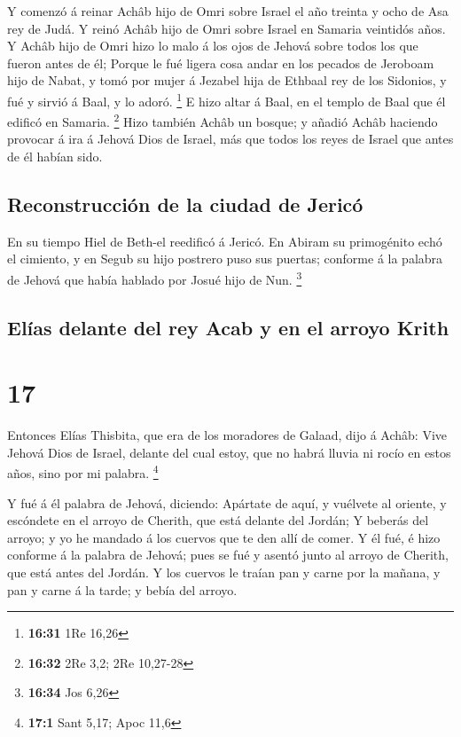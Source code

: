  Y comenzó á reinar Achâb hijo de Omri sobre Israel el
año treinta y ocho de Asa rey de Judá.  Y reinó Achâb
hijo de Omri sobre Israel en Samaria veintidós años. Y Achâb hijo de
Omri hizo lo malo á los ojos de Jehová sobre todos los que fueron antes
de él;  Porque le fué ligera cosa andar en los pecados de
Jeroboam hijo de Nabat, y tomó por mujer á Jezabel hija de Ethbaal rey
de los Sidonios, y fué y sirvió á Baal, y lo adoró. \footnote{\textbf{16:31}
  1Re 16,26}  E hizo altar á Baal, en el templo de Baal
que él edificó en Samaria. \footnote{\textbf{16:32} 2Re 3,2; 2Re
  10,27-28}  Hizo también Achâb un bosque; y añadió Achâb
haciendo provocar á ira á Jehová Dios de Israel, más que todos los reyes
de Israel que antes de él habían sido.

\hypertarget{reconstrucciuxf3n-de-la-ciudad-de-jericuxf3}{%
\subsection{Reconstrucción de la ciudad de
Jericó}\label{reconstrucciuxf3n-de-la-ciudad-de-jericuxf3}}

 En su tiempo Hiel de Beth-el reedificó á Jericó. En
Abiram su primogénito echó el cimiento, y en Segub su hijo postrero puso
sus puertas; conforme á la palabra de Jehová que había hablado por Josué
hijo de Nun. \footnote{\textbf{16:34} Jos 6,26}

\hypertarget{eluxedas-delante-del-rey-acab-y-en-el-arroyo-krith}{%
\subsection{Elías delante del rey Acab y en el arroyo
Krith}\label{eluxedas-delante-del-rey-acab-y-en-el-arroyo-krith}}

\hypertarget{section-16}{%
\section{17}\label{section-16}}

 Entonces Elías Thisbita, que era de los moradores de
Galaad, dijo á Achâb: Vive Jehová Dios de Israel, delante del cual
estoy, que no habrá lluvia ni rocío en estos años, sino por mi palabra.
\footnote{\textbf{17:1} Sant 5,17; Apoc 11,6}

 Y fué á él palabra de Jehová, diciendo: 
Apártate de aquí, y vuélvete al oriente, y escóndete en el arroyo de
Cherith, que está delante del Jordán;  Y beberás del
arroyo; y yo he mandado á los cuervos que te den allí de comer.
 Y él fué, é hizo conforme á la palabra de Jehová; pues se
fué y asentó junto al arroyo de Cherith, que está antes del Jordán.
 Y los cuervos le traían pan y carne por la mañana, y pan
y carne á la tarde; y bebía del arroyo.

